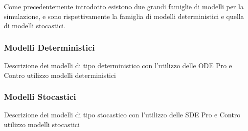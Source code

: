 Come precedentemente introdotto esistono due grandi famiglie di modelli
per la simulazione, e sono rispettivamente la famiglia di modelli deterministici
e quella di modelli stocastici.

\subsubsection{Modelli Deterministici}
Descrizione dei modelli di tipo deterministico con l'utilizzo delle ODE
Pro e Contro utilizzo modelli deterministici

\subsubsection{Modelli Stocastici}
Descrizione dei modelli di tipo stocastico con l'utilizzo delle SDE
Pro e Contro utilizzo modelli stocastici